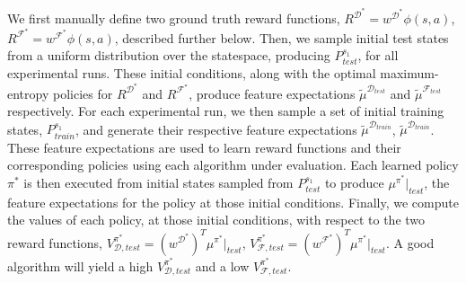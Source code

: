 \documentclass[letterpaper]{article}
\begin{document}
We first manually define two ground truth reward functions, $R^{\mathcal{D}^*} = w^{\mathcal{D}^*}\phi(s,a)$, $R^{\mathcal{F}^*} = w^{\mathcal{F}^*}\phi(s,a)$, described further below. Then, we sample initial test states from a uniform distribution over the statespace, producing $P^{s_1}_{test}$, for all experimental runs. These initial conditions, along with the optimal maximum-entropy policies for $R^{\mathcal{D}^*}$ and $R^{\mathcal{F}^*}$, produce feature expectations $\widetilde{\mu}^{\mathcal{D}_{test}}$ and $\widetilde{\mu}^{\mathcal{F}_{test}}$ respectively. For each experimental run, we then sample a set of initial training states, $P^{s_{1}}_{train}$, and generate their respective feature expectations $\widetilde{\mu}^{\mathcal{D}_{train}}$, $\widetilde{\mu}^{\mathcal{D}_{train}}$. These feature expectations are used to learn reward functions and their corresponding  policies using each algorithm under evaluation. Each learned policy $\pi^*$ is then executed from initial states sampled from $P^{s_{1}}_{test}$ to produce $\mu^{\pi^*}|_{test}$, the feature expectations for the policy at those initial conditions. Finally, we compute the values of each policy, at those initial conditions, with respect to the two reward functions, $V^{\pi^*}_{\mathcal{D},test} = (w^{\mathcal{D}^*})^T\mu^{\pi^*}|_{test}$, $V^{\pi^*}_{\mathcal{F},test} = (w^{\mathcal{F}^*})^T\mu^{\pi^*}|_{test}$. A good algorithm will yield a high $V^{\pi^*}_{\mathcal{D},test}$ and a low $V^{\pi^*}_{\mathcal{F},test}$.
\end{document}
